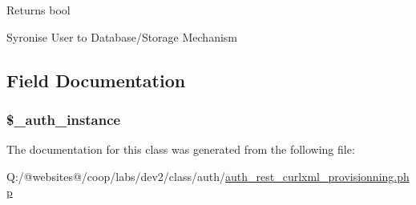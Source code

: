 \begin{DoxyReturn}{Returns}
bool 
\end{DoxyReturn}
Syronise User to Database/\-Storage Mechanism

\subsection{Field Documentation}
\hypertarget{class_xortify_auth_rest___curlxml_provisionning_a486ed878bb5a7188c99ac4c9ee46ac6e}{
\subsubsection[{\$\-\_\-auth\-\_\-instance}]{\setlength{\rightskip}{0pt plus 5cm}\$\-\_\-auth\-\_\-instance}}\label{class_xortify_auth_rest___curlxml_provisionning_a486ed878bb5a7188c99ac4c9ee46ac6e}


The documentation for this class was generated from the following file\-:\begin{DoxyCompactItemize}
\item 
Q\-:/@websites@/coop/labs/dev2/class/auth/\hyperlink{auth__rest__curlxml__provisionning_8php}{auth\-\_\-rest\-\_\-curlxml\-\_\-provisionning.\-php}\end{DoxyCompactItemize}
